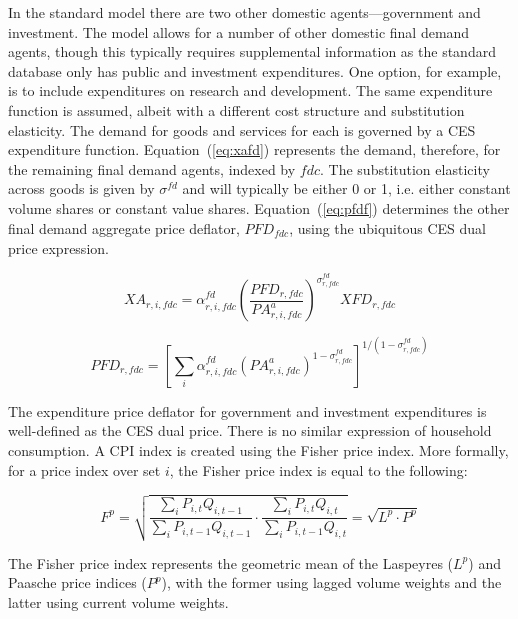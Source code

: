 \documentclass[11pt,letterpaper]{report}
\begin{document}
In the standard model there are two other domestic agents---government and
investment. The model allows for a number of other domestic final
demand agents, though this typically requires supplemental information
as the standard database only has public and investment expenditures.
One option, for example, is to include expenditures on research
and development. The same expenditure function is assumed, albeit
with a different cost structure and substitution elasticity.
The demand for goods and services for each is governed by a CES
expenditure function. Equation~(\ref{eq:xafd}) represents the demand, therefore,
for the remaining final demand agents, indexed by $\mathit{fdc}$. The
substitution elasticity across goods is given by $\sigma^{\mathit{fd}}$ and will
typically be either 0 or 1, i.e. either constant volume shares or constant value
shares. Equation~(\ref{eq:pfdf}) determines the other final demand aggregate
price deflator, $\mathit{PFD_{fdc}}$, using the ubiquitous CES dual price
expression.

\begin{equation}
\label{eq:xafd}
\mathit{XA}_{r,i,\mathit{fdc}} =
   \alpha^{\mathit{fd}}_{r,i,\mathit{fdc}}
   \left( \frac {\mathit{PFD}_{r,\mathit{fdc}}}
      {\mathit{PA}^a_{r,i,\mathit{fdc}}}
   \right)^{\sigma^{\mathit{fd}}_{r,\mathit{fdc}}}
   \mathit{XFD}_{r,\mathit{fdc}}
\end{equation}

\begin{equation}
\label{eq:pfdf}
\mathit{PFD_{r,\mathit{fdc}}} =
   \left[
      \sum_i{
         \alpha^{\mathit{fd}}_{r,i,\mathit{fdc}}
         \left( \mathit{PA}^a_{r,i,\mathit{fdc}}
         \right)^{1-\sigma^{\mathit{fd}}_{r,\mathit{fdc}}}
      }
   \right]^{1/(1-\sigma^{\mathit{fd}}_{r,\mathit{fdc}})}
\end{equation}

The expenditure price deflator for government and investment expenditures is
well-defined as the CES dual price. There is no similar expression of household
consumption. A CPI index is created using the Fisher price index. More formally,
for a price index over set $i$, the Fisher price index is equal to the
following:

\[
F^p =
\sqrt{
   \frac{\sum_i{P_{i,t} Q_{i,t-1}}} {\sum_i{P_{i,t-1} Q_{i,t-1}} } \cdot
   \frac{\sum_i{P_{i,t} Q_{i,t}}} {\sum_i{P_{i,t-1} Q_{i,t}} }
}
=  \sqrt{L^p \cdot P^p}
\]

\noindent The Fisher price index represents the geometric mean of the Laspeyres
($L^p$) and Paasche price indices ($P^p$), with the former using lagged volume
weights and the latter using current volume weights.
\end{document}
